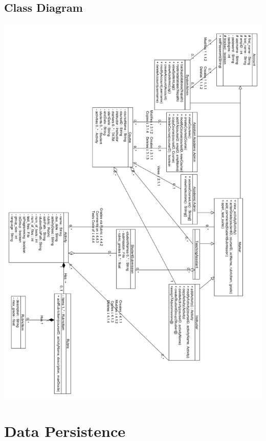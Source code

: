 \documentclass{article}
\begin{document}
\subsection{Class Diagram}
\centerline{\includegraphics[scale=0.5]{../images/Class_Diagram_Detailed}}

\section{Data Persistence}
\end{document}
